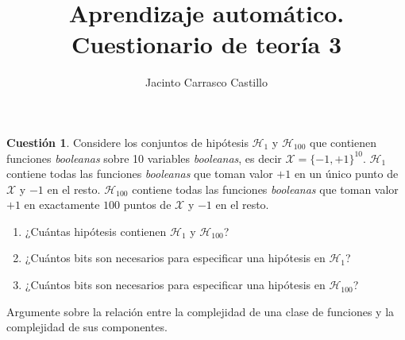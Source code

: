 \documentclass[11pt,leqno]{article}
\title{Aprendizaje autom\'atico. Cuestionario de teor\'ia 3}
\author{Jacinto Carrasco Castillo}
\theoremstyle{definition}
\begin{document}
\maketitle

\newtheorem{cuestion}{Cuestión}
\newtheorem{solucion}{Solución}
\newtheorem{cuestionopcional}{Cuestión Opcional}
\newtheorem{solucionopcional}{Solución Opcional}


\begin{cuestion}
Considere los conjuntos de hipótesis $\mathcal{H}_1$ y $\mathcal{H}_{100}$ que contienen funciones \textit{booleanas} sobre 10 variables \textit{booleanas}, es decir $\mathcal{X} = \{-1, +1\}^{10}$. $\mathcal{H}_1$ contiene todas las funciones \textit{booleanas} que toman valor $+1$ en un único punto de $\mathcal{X}$ y $-1$ en el resto. $\mathcal{H}_{100}$ contiene todas las funciones \textit{booleanas} que toman valor $+1$ en exactamente $100$ puntos de $\mathcal{X}$ y $-1$ en el resto.
\begin{enumerate}[a]
\item ¿Cuántas hipótesis contienen $\mathcal{H}_1$ y $\mathcal{H}_{100}$?
\item ¿Cuántos bits son necesarios para especificar una hipótesis en $\mathcal{H}_1$?
\item ¿Cuántos bits son necesarios para especificar una hipótesis en $\mathcal{H}_{100}$?
\end{enumerate}

	Argumente sobre la relación entre la complejidad de una clase de funciones y la complejidad de sus componentes.
\end{cuestion}
\end{document}
